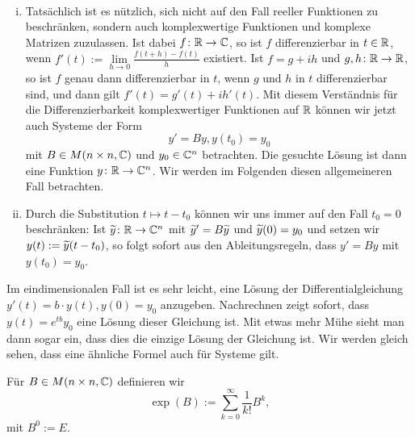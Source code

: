 \begin{bemerkung}
	\label{bem:}
	\mbox{} \\[-1.4cm]
	\begin{enumerate}[(i)]
		\item Tatsächlich ist es nützlich, sich nicht auf den Fall reeller Funktionen zu beschränken, sondern auch komplexwertige Funktionen und komplexe Matrizen zuzulassen.
		Ist dabei $f\colon \mathbb{R} \rightarrow \mathbb{C}$, so ist $f$ differenzierbar in $t \in \mathbb{R}$, wenn $f'(t) := \lim\limits_{h \rightarrow 0} \frac{f(t+h) - f(t)}{h}$ existiert.
		Ist $f = g + ih$ und $g,h \colon \mathbb{R} \rightarrow \mathbb{R}$, so ist $f$ genau dann differenzierbar in $t$, wenn $g$ und $h$ in $t$ differenzierbar sind, und dann gilt $f'(t) = g'(t) + ih'(t)$.
		Mit diesem Verständnis für die Differenzierbarkeit komplexwertiger Funktionen auf $\mathbb{R}$ können wir jetzt auch Systeme der Form
		\[
			y' = By, y(t_0)=y_0
		\]
		mit $B \in M(n \times n,\mathbb{C})$ und $y_0 \in \mathbb{C}^n$ betrachten.
		Die gesuchte Lösung ist dann eine Funktion $y\colon \mathbb{R} \rightarrow \mathbb{C}^n$.
		Wir werden im Folgenden diesen allgemeineren Fall betrachten.
		\item Durch die Substitution $t \mapsto t-t_0$ können wir uns immer auf den Fall $t_0 = 0$ beschränken:
		Ist $\widetilde{y} \colon \mathbb{R} \rightarrow \mathbb{C}^n$ mit $\widetilde{y}' = B \widetilde{y}$ und $\widetilde{y}(0) = y_0$ und setzen wir $y(t) := \widetilde{y}(t-t_0)$, so folgt sofort aus den Ableitungsregeln, dass $y' = By$ mit $y(t_0) = y_0$.
	\end{enumerate}
\end{bemerkung}

Im eindimensionalen Fall ist es sehr leicht, eine Lösung der Differentialgleichung $y'(t) = b \cdot y(t), y(0) = y_0$ anzugeben.
Nachrechnen zeigt sofort, dass $y(t) = e^{tb} y_0$ eine Lösung dieser Gleichung ist.
Mit etwas mehr Mühe sieht man dann sogar ein, dass dies die einzige Lösung der Gleichung ist.
Wir werden gleich sehen, dass eine ähnliche Formel auch für Systeme gilt.

\begin{definition}
	\label{def:10.3}
	Für $B \in M(n \times n,\mathbb{C})$ definieren wir
	\[
		\exp(B) := \sum\limits_{k=0}^\infty \frac{1}{k!} B^k,
	\]
	mit $B^0 := E$. 
\end{definition}


